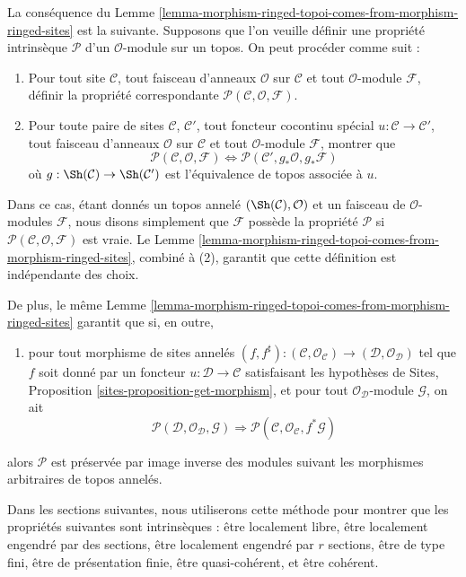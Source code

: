 \medskip\noindent
La conséquence du Lemme
\ref{lemma-morphism-ringed-topoi-comes-from-morphism-ringed-sites} est la
suivante. Supposons que l'on veuille définir une propriété intrinsèque
$\mathcal{P}$ d'un $\mathcal{O}$-module sur un topos. On peut procéder comme
suit :
\begin{enumerate}
\item Pour tout site $\mathcal{C}$, tout faisceau d'anneaux $\mathcal{O}$ sur
$\mathcal{C}$ et tout $\mathcal{O}$-module $\mathcal{F}$, définir la propriété
correspondante $\mathcal{P}(\mathcal{C}, \mathcal{O}, \mathcal{F})$.
\item Pour toute paire de sites $\mathcal{C}$, $\mathcal{C}'$, tout foncteur
cocontinu spécial $u : \mathcal{C} \to \mathcal{C}'$, tout faisceau d'anneaux
$\mathcal{O}$ sur $\mathcal{C}$ et tout $\mathcal{O}$-module $\mathcal{F}$,
montrer que
$$
\mathcal{P}(\mathcal{C}, \mathcal{O}, \mathcal{F})
\Leftrightarrow
\mathcal{P}(\mathcal{C}', g_*\mathcal{O}, g_*\mathcal{F})
$$
où $g : \Sh(\mathcal{C}) \to \Sh(\mathcal{C}')$ est l'équivalence de topos
associée à $u$.
\end{enumerate}
Dans ce cas, étant donnés un topos annelé
$(\Sh(\mathcal{C}), \mathcal{O})$ et un faisceau de $\mathcal{O}$-modules
$\mathcal{F}$, nous disons simplement que $\mathcal{F}$ possède la
propriété $\mathcal{P}$ si
$\mathcal{P}(\mathcal{C}, \mathcal{O}, \mathcal{F})$ est vraie. Le Lemme
\ref{lemma-morphism-ringed-topoi-comes-from-morphism-ringed-sites}, combiné à
(2), garantit que cette définition est indépendante des choix.

\medskip\noindent
De plus, le même Lemme
\ref{lemma-morphism-ringed-topoi-comes-from-morphism-ringed-sites} garantit que
si, en outre,
\begin{enumerate}
\item[(3)] pour tout morphisme de sites annelés
$(f, f^\sharp) :
(\mathcal{C}, \mathcal{O}_\mathcal{C})
\to
(\mathcal{D}, \mathcal{O}_\mathcal{D})$
tel que $f$ soit donné par un foncteur
$u : \mathcal{D} \to \mathcal{C}$ satisfaisant les hypothèses de Sites,
Proposition \ref{sites-proposition-get-morphism}, et pour tout
$\mathcal{O}_\mathcal{D}$-module $\mathcal{G}$, on ait
$$
\mathcal{P}(\mathcal{D}, \mathcal{O}_\mathcal{D}, \mathcal{G})
\Rightarrow
\mathcal{P}(\mathcal{C}, \mathcal{O}_\mathcal{C}, f^*\mathcal{G})
$$
\end{enumerate}
alors $\mathcal{P}$ est préservée par image inverse des modules suivant les
morphismes arbitraires de topos annelés.

\medskip\noindent
Dans les sections suivantes, nous utiliserons cette méthode pour montrer que les
propriétés suivantes sont intrinsèques : être localement libre, être localement
engendré par des sections, être localement engendré par $r$ sections, être de
type fini, être de présentation finie, être quasi-cohérent, et être cohérent.

